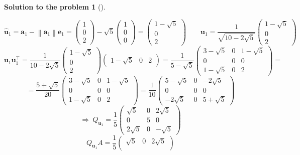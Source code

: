 \documentclass[12pt,a4]{article}
\newtheorem{solution}{Solution to the problem}
\newcommand{\ba}{{\mathbf a}}
\newcommand{\be}{{\mathbf e}}
\newcommand{\bu}{{\mathbf u}}
\newcommand{\norm}[1]{\left\lVert#1\right\rVert}
\begin{document}
\begin{solution}[]
\begin{enumerate}[(a)]
\[\]
\[
\hat \bu_1 = \ba_1 - \norm{\ba_1} \be_1 = 
\begin{pmatrix} 1 \\ 0  \\ 2  \end{pmatrix}
-
\sqrt 5
\begin{pmatrix} 1 \\ 0  \\ 0  \end{pmatrix}
=
\begin{pmatrix} 1 - \sqrt 5 \\ 0  \\ 2  \end{pmatrix}
\qquad
\bu_1 =
\frac{1}{\sqrt{10 - 2\sqrt 5}}
\begin{pmatrix} 1 - \sqrt 5 \\ 0  \\ 2  \end{pmatrix}
\]
\[
\bu_1\bu_1^\top = 
\frac{1}{10 - 2\sqrt 5}
\begin{pmatrix} 1 - \sqrt 5 \\ 0  \\ 2  \end{pmatrix}
\begin{pmatrix} 1 - \sqrt 5 & 0  & 2  \end{pmatrix}
=
\frac{1}{5 - \sqrt 5}
\begin{pmatrix}
3 - \sqrt 5 & 0 & 1 - \sqrt 5\\
0 & 0 & 0 \\
1 - \sqrt 5 & 0 & 2
\end{pmatrix} =
\]\[
=
\frac{5 + \sqrt 5}{20}
\begin{pmatrix}
3 - \sqrt 5 & 0 & 1 - \sqrt 5\\
0 & 0 & 0 \\
1 - \sqrt 5 & 0 & 2
\end{pmatrix} =
\frac{1}{10}
\begin{pmatrix}
5 - \sqrt 5 & 0 & - 2\sqrt 5\\
0 & 0 & 0 \\
- 2\sqrt 5 & 0 & 5 + \sqrt 5
\end{pmatrix}
\]
\[
\Rightarrow ~
Q_{\bu_1} =
\frac{1}{5}
\begin{pmatrix}
\sqrt 5 & 0 & 2\sqrt 5\\
0 & 5 & 0 \\
2\sqrt 5 & 0 & - \sqrt 5
\end{pmatrix}
\]
\[
Q_{\bu_1}A =
\frac{1}{5}
\begin{pmatrix}
\sqrt 5 & 0 & 2\sqrt 5\\

\end{pmatrix}\]
\end{enumerate}
\end{solution}
\end{document}

